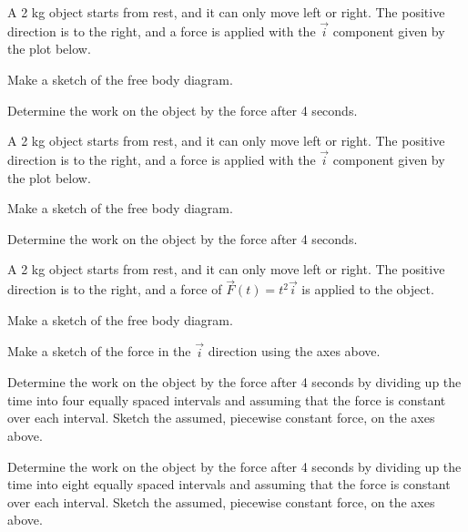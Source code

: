 \begin{problem}
\item A 2 kg object starts from rest, and it can only move left or
  right. The positive direction is to the right, and a force is
  applied with the  $\vec{i}$ component given by the plot below.

  \scalebox{0.5}{}

  \begin{subproblem}
    \item Make a sketch of the free body diagram.
      \vspace{4em}
    \item Determine the work on the object by the force after 4
      seconds.  
      \vfill
  \end{subproblem}
  \clearpage

\item A 2 kg object starts from rest, and it can only move left or
  right. The positive direction is to the right, and a force is
  applied with the  $\vec{i}$ component given by the plot below.

  \scalebox{0.5}{}

  \begin{subproblem}
    \item Make a sketch of the free body diagram.
      \vspace{4em}
    \item Determine the work on the object by the force after 4
      seconds.  
      \vfill
  \end{subproblem}
  \clearpage

\item A 2 kg object starts from rest, and it can only move left or
  right. The positive direction is to the right, and a force of
  $\vec{F}(t)=t^2 \vec{i}$ is applied to the object.

  \scalebox{0.5}{}

  \begin{subproblem}
    \item Make a sketch of the free body diagram.
      \vspace{4em}
    \item Make a sketch of the force in the $\vec{i}$ direction using
      the axes above.
    \item Determine the work on the object by the force after 4
      seconds by dividing up the time into four equally spaced
      intervals and assuming that the force is constant over each
      interval. Sketch the assumed, piecewise constant force, on the
      axes above.  
      \vfill
    \item Determine the work on the object by the force after 4
      seconds by dividing up the time into eight equally spaced
      intervals and assuming that the force is constant over each
      interval. Sketch the assumed, piecewise constant force, on the
      axes above.  
      \vfill
  \end{subproblem}
  \clearpage

\end{problem}
